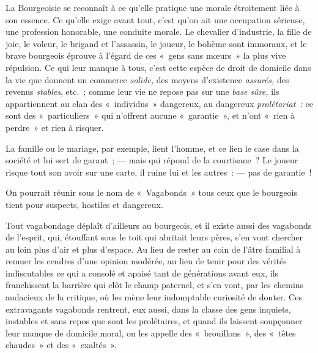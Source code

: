 \documentclass[french,twoside]{book} %
\begin{document}
La Bourgeoisie se reconnaît à ce qu’elle pratique une morale étroitement liée à son essence. Ce qu’elle exige avant tout, c’est qu’on ait une occupation sérieuse, une profession honorable, une conduite morale. Le chevalier d’industrie, la fille de joie, le voleur, le brigand et l’assassin, le joueur, le bohème sont immoraux, et le brave bourgeois éprouve à l’égard de ces « gens sans mœurs » la plus vive répulsion. Ce qui leur manque à tous, c’est cette espèce de droit de domicile dans la vie que donnent un commerce \emph{solide, }des moyens d’existence \emph{assurés,} des revenus \emph{stables}, etc. ; comme leur vie ne repose pas sur une \emph{base sûre,} ils appartiennent au clan des « individus » dangereux,  au dangereux \emph{prolétariat :} ce sont des « particuliers » qui n’offrent aucune « garantie », et n’ont « rien à perdre » et rien à risquer.\par
La famille ou le mariage, par exemple, lient l’homme, et ce lien le case dans la société et lui sert de garant ; — mais qui répond de la courtisane ? Le joueur risque tout son avoir sur une carte, il ruine lui et les autres : — pas de garantie !\par
On pourrait réunir sous le nom de « Vagabonds » tous ceux que le bourgeois tient pour suspects, hostiles et dangereux.\par
Tout vagabondage déplaît d’ailleurs au bourgeois, et il existe aussi des vagabonds de l’esprit, qui, étouffant sous le toit qui abritait leurs pères, s’en vont chercher au loin plus d’air et plus d’espace. Au lieu de rester au coin de l’âtre familial à remuer les cendres d’une opinion modérée, au lieu de tenir pour des vérités indiscutables ce qui a consolé et apaisé tant de générations avant eux, ils franchissent la barrière qui clôt le champ paternel, et s’en vont, par les chemins audacieux de la critique, où les mène leur indomptable curiosité de douter. Ces extravagants vagabonds rentrent, eux aussi, dans la classe des gens inquiets, instables et sans repos que sont les prolétaires, et quand ils laissent soupçonner leur manque de domicile moral, on les appelle des « brouillons », des « têtes chaudes » et des « exaltés ».\par
\end{document}

